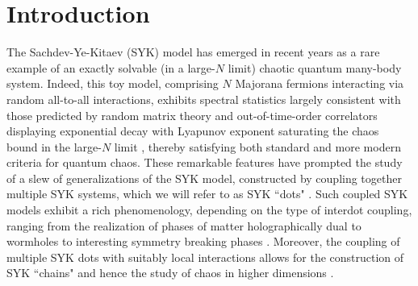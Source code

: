 \documentclass[reprint, floatfix,eqsecnum,superscriptaddress,preprint,nofootinbib,onecolumn,amsmath,amssymb,aps,prb]{revtex4-2}
\begin{document}

\section{Introduction}

The Sachdev-Ye-Kitaev (SYK) model \cite{Sachdev1993,Kitaev2015,Maldacena2016} has emerged in recent years as a %
rare example of an exactly solvable (in a large-$N$ limit) chaotic quantum many-body system.
Indeed, this toy model, comprising $N$ Majorana fermions interacting via random all-to-all interactions, exhibits spectral statistics largely consistent with those predicted by random matrix theory \cite{garciagarcia2016,You2017,Cotler2017} and out-of-time-order correlators displaying exponential decay with Lyapunov exponent saturating the chaos bound in the large-$N$ limit \cite{Kitaev2015,Maldacena2016}, thereby satisfying both standard and more modern criteria for quantum chaos. %
These remarkable features have prompted the study of a slew of generalizations of the SYK model, constructed by coupling together multiple SYK systems, which we will refer to as SYK ``dots" \cite{Chen2017,Banerjee2017,Haldar2018,milekhin2021nonlocal}. Such coupled SYK models exhibit a rich phenomenology, depending on the type of interdot coupling, ranging from the realization of phases of matter holographically dual to wormholes \cite{Maldacena2018} to interesting symmetry breaking phases \cite{Kim2019,Klebanov2020,Sahoo2020}. Moreover, the coupling of multiple SYK dots with suitably local interactions allows for the construction of SYK ``chains" and hence the study of chaos in higher dimensions \cite{Gu2017a,Gu2017c,Song2017,Jian2017,Davison2017,Jian2018,Khevschenko2018,Khveshchenko2020,Liu2020}. 
\end{document}
